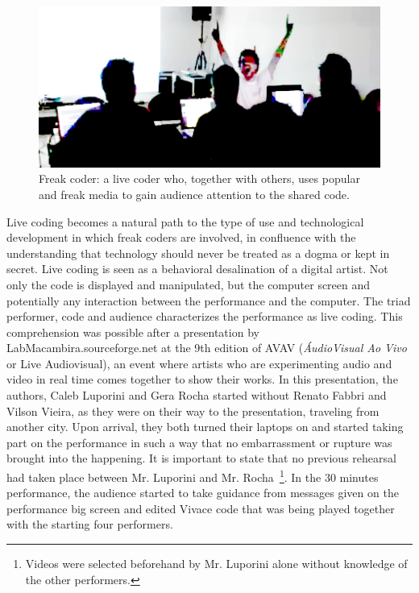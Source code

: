 \documentclass[letterpaper, 12pt]{article}
\begin{document}
\begin{figure}[htpb]
  \begin{center}
    \includegraphics[scale=.4]{img/fig_freakcoder.png}
    \caption{Freak coder: a live coder who, together with others, uses
      popular and freak media to gain audience attention to the shared
      code.}
    \label{fig:freakcoder}
  \end{center}
\end{figure}

Live coding becomes a natural path to the type of use and
technological development in which freak coders are involved, in
confluence with the understanding that technology should never be
treated as a dogma or kept in secret. Live coding is seen as a
behavioral desalination of a digital artist. Not only the code is
displayed and manipulated, but the computer screen and potentially any
interaction between the performance and the computer. The triad
performer, code and audience characterizes the performance as live
coding.  This comprehension was possible after a presentation by
LabMacambira.sourceforge.net at the 9th edition of AVAV
(\textit{\'{A}udioVisual Ao Vivo} or Live Audiovisual), an event where
artists who are experimenting audio and video in real time comes
together to show their works. In this presentation, the authors, Caleb
Luporini and Gera Rocha started without Renato Fabbri and Vilson
Vieira, as they were on their way to the presentation, traveling from
another city. Upon arrival, they both turned their laptops on and
started taking part on the performance in such a way that no
embarrassment or rupture was brought into the happening.  It is
important to state that no previous rehearsal had taken place between
Mr. Luporini and Mr. Rocha~\footnote{Videos were selected beforehand
  by Mr. Luporini alone without knowledge of the other
  performers.}. In the 30 minutes performance, the audience started to
take guidance from messages given on the performance big screen and
edited Vivace code that was being played together with the starting
four performers.
\end{document}
